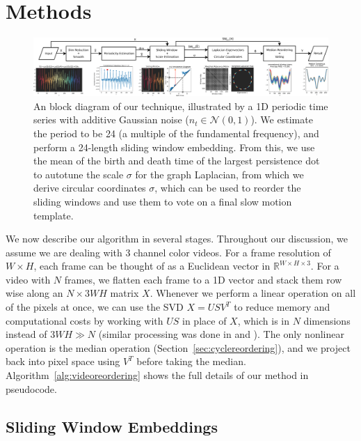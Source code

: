 \documentclass{article}
\begin{document}
\section{Methods}
\label{sec:methods}

\begin{figure}
\centering
\includegraphics[width=\textwidth]{BlockDiagram.pdf}
\caption{An block diagram of our technique, illustrated by a 1D periodic time series with additive Gaussian noise ($n_t \in \mathcal{N}(0, 1)$).  We estimate the period to be 24 (a multiple of the fundamental frequency), and perform a 24-length sliding window embedding.  From this, we use the mean of the birth and death time of the largest persistence dot to autotune the scale $\sigma$ for the graph Laplacian, from which we derive circular coordinates $\sigma$, which can be used to reorder the sliding windows and use them to vote on a final slow motion template.}
\label{fig:ConceptFigure}
\end{figure}



We now describe our algorithm in several stages.  Throughout our discussion, we assume we are dealing with 3 channel color videos.  For a frame resolution of $W \times H$, each frame can be thought of as a Euclidean vector in $\mathbb{R}^{W \times H \times 3}$.  For a video with $N$ frames, we flatten each frame to a 1D vector and stack them row wise along an $N \times 3WH$ matrix $X$.  Whenever we perform a linear operation on all of the pixels at once, we can use the SVD $X = USV^T$ to reduce memory and computational costs by working with $US$ in place of $X$, which is in $N$ dimensions instead of $3WH \gg N$ (similar processing was done in \cite{turk1991eigenfaces} and \cite{tralie2017quasi}).  The only nonlinear operation is the median operation (Section~\ref{sec:cyclereordering}), and we project back into pixel space using $V^T$ before taking the median. Algorithm~\ref{alg:videoreordering} shows the full details of our method in pseudocode.

\subsection{Sliding Window Embeddings}
\label{sec:slidingwindow}
\end{document}
